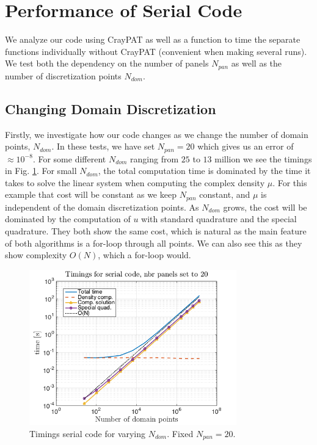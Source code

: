 \documentclass[a4paper,10pt]{article}
\begin{document}
\FloatBarrier

\section*{Performance of Serial Code}
We analyze our code using CrayPAT as well as a function to time the separate functions individually without CrayPAT (convenient when making several runs). We test both the dependency on the number of panels $N_{pan}$ as well as the number of discretization points $N_{dom}$.

\subsection*{Changing Domain Discretization}
Firstly, we investigate how our code changes as we change the number of domain points, $N_{dom}$. In these tests, we have set $N_{pan}=20$ which gives us an error of $\approx 10^{-8}$. For some different $N_{dom}$ ranging from $25$ to $13$ million we see the timings in Fig. \ref{fig:serial1}. For small $N_{dom}$, the total computation time is dominated by the time it takes to solve the linear system when computing the complex density $\mu$. For this example that cost will be constant as we keep $N_{pan}$ constant, and $\mu$ is independent of the domain discretization points. As $N_{dom}$ grows, the cost will be dominated by the computation of $u$ with standard quadrature and the special quadrature. They both show the same cost, which is natural as the main feature of both algorithms is a for-loop through all points. We can also see this as they show complexity $O(N)$, which a for-loop would. 
\begin{figure}[ht]
    \begin{center}
        \includegraphics[width=0.8\textwidth]{Graphics/timing_serial_npanels20.png}
    \end{center}
    \caption{Timings serial code for varying $N_{dom}$. Fixed $N_{pan}=20$.}
    \label{fig:serial1}
\end{figure}
\end{document}
